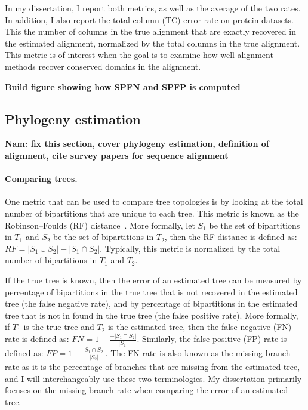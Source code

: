 In my dissertation, I report both metrics, as well as the average of the two rates.  In addition, I also report the total column (TC) error rate on protein datasets.  This the number of columns in the true alignment that are exactly recovered in the estimated alignment, normalized by the total columns in the true alignment.  This metric is of interest when the goal is to examine how well alignment methods recover conserved domains in the alignment.


\textbf{Build figure showing how SPFN and SPFP is computed}

\subsection{Phylogeny estimation}\label{back:alignment}
\textbf{Nam:  fix this section, cover phylogeny estimation, definition of alignment, cite survey papers for sequence alignment}

\paragraph{Comparing trees.}  One metric that can be used to compare tree topologies is by looking at the total number of bipartitions that are unique to each tree.  This metric is known as the Robinson–Foulds (RF) distance~\cite{RF}.  More formally, let $S_1$ be the set of bipartitions in $T_1$ and $S_2$ be the set of bipartitions in $T_2$, then the RF distance is defined as: $RF=|S_1\cup S_2|-|S_1\cap S_2|$. Typically, this metric is normalized by the total number of bipartitions in $T_1$ and $T_2$.  

If the true tree is known, then the error of an estimated tree can be measured by percentage of bipartitions in the true tree that is not recovered in the estimated tree (the false negative rate), and by percentage of bipartitions in the estimated tree that is not in found in the true tree (the false positive rate).  More formally, if $T_1$ is the true tree and $T_2$ is the estimated tree, then the false negative (FN) rate is defined as: $FN=1-\frac{-|S_1\cap S_2|}{|S_1|}$.  Similarly, the false positive (FP) rate is defined as: $FP=1-\frac{|S_1\cap S_2|}{|S_2|}$.  The FN rate is also known as the missing branch rate as it is the percentage of branches that are missing from the estimated tree, and I will interchangeably use these two terminologies.  My dissertation primarily focuses on the missing branch rate when comparing the error of an estimated tree.

